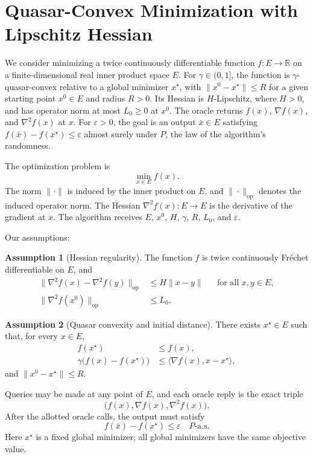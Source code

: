 \documentclass[10pt]{article}
\theoremstyle{definition}
\newtheorem{assumption}{Assumption}
\begin{document}
\section*{Quasar-Convex Minimization with Lipschitz Hessian}
We consider minimizing a twice continuously differentiable function $f:E\to\mathbb{R}$ on a finite-dimensional real inner product space $E$. For $\gamma\in(0,1]$, the function is $\gamma$-quasar-convex relative to a global minimizer $x^\star$, with $\|x^0-x^\star\|\leq R$ for a given starting point $x^0\in E$ and radius $R>0$. Its Hessian is $H$-Lipschitz, where $H>0$, and has operator norm at most $L_0\geq0$ at $x^0$. The oracle returns $f(x)$, $\nabla f(x)$, and $\nabla^2 f(x)$ at $x$. For $\varepsilon>0$, the goal is an output $\bar{x}\in E$ satisfying $f(\bar{x})-f(x^\star)\leq\varepsilon$ almost surely under $P$, the law of the algorithm's randomness.

The optimization problem is
\[
\min_{x\in E} f(x).
\]
The norm $\|\cdot\|$ is induced by the inner product on $E$, and $\|\cdot\|_{\mathrm{op}}$ denotes the induced operator norm. The Hessian $\nabla^2 f(x):E\to E$ is the derivative of the gradient at $x$. The algorithm receives $E$, $x^0$, $H$, $\gamma$, $R$, $L_0$, and $\varepsilon$.

Our assumptions:
\begin{assumption}[Hessian regularity]
The function $f$ is twice continuously Fr\'echet differentiable on $E$, and
\[
\begin{aligned}
\|\nabla^2 f(x)-\nabla^2 f(y)\|_{\mathrm{op}}
&\leq H\|x-y\| &&\text{for all }x,y\in E,\\
\|\nabla^2 f(x^0)\|_{\mathrm{op}}&\leq L_0.
\end{aligned}
\]
\end{assumption}

\begin{assumption}[Quasar convexity and initial distance]
There exists $x^\star\in E$ such that, for every $x\in E$,
\[
\begin{aligned}
f(x^\star)&\leq f(x),\\
\gamma\bigl(f(x)-f(x^\star)\bigr)
&\leq \langle\nabla f(x),x-x^\star\rangle,
\end{aligned}
\]
and $\|x^0-x^\star\|\leq R$.
\end{assumption}

Queries may be made at any point of $E$, and each oracle reply is the exact triple
\[
\bigl(f(x),\nabla f(x),\nabla^2 f(x)\bigr).
\]
After the allotted oracle calls, the output must satisfy
\[
f(\bar{x})-f(x^\star)\leq\varepsilon
\quad P\text{-a.s.}
\]
Here $x^\star$ is a fixed global minimizer; all global minimizers have the same objective value.
\end{document}
